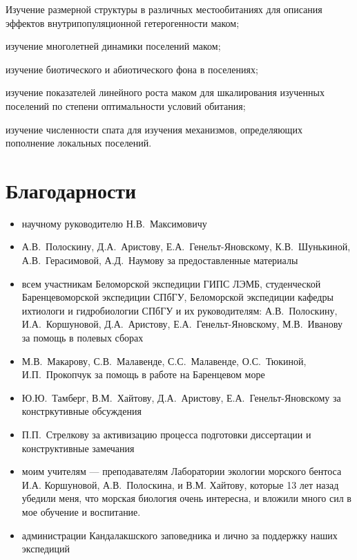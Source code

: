 
    \item Изучение размерной %
структуры в различных местообитаниях для описания эффектов внутрипопуляционной гетерогенности маком;
    \item изучение многолетней динамики поселений маком;
    \item изучение биотического и абиотического фона в поселениях;
    \item изучение показателей линейного роста маком для шкалирования изученных поселений по степени оптимальности условий обитания;
    \item изучение численности спата для изучения механизмов, определяющих пополнение локальных поселений.



\section{Благодарности}
	\begin{itemize}
		\item{научному руководителю Н.\:В.~Максимовичу}
		\item{А.\:В.~Полоскину, Д.\:А.~Аристову, Е.\:А.~Генельт-Яновскому, К.\:В.~Шунькиной, А.\:В.~Герасимовой, А.\:Д.~Наумову за предоставленные материалы}
		\item{всем участникам Беломорской экспедиции ГИПС ЛЭМБ, студенческой Баренцевоморской экспедиции СПбГУ, Беломорской экспедиции кафедры ихтиологи и гидробиологии СПбГУ и их руководителям: А.\:В.~Полоскину, И.\:А.~Коршуновой, Д.\:А.~Аристову, Е.\:А.~Генельт-Яновскому, М.В.~Иванову за помощь в полевых сборах}
		\item{М.\:В.~Макарову, С.\:В.~Малавенде, С.\:С.~Малавенде, О.\:С.~Тюкиной, И.\:П.~Прокопчук за помощь в работе на Баренцевом море}
		\item{Ю.\:Ю.~Тамберг, В.\:М.~Хайтову, Д.\:А.~Аристову, Е.\:А.~Генельт-Яновскому за констркутивные обсуждения}
		\item{П.\:П.~Стрелкову за активизацию процесса подготовки диссертации и конструктивные замечания}
		\item{моим учителям --- преподавателям Лаборатории экологии морского бентоса И.\:А. Коршуновой, А.\:В.~Полоскина,  и В.\:М. Хайтову, которые 13 лет назад убедили меня, что морская биология очень интересна, и вложили много сил в мое обучение и воспитание.}
		\item{администрации Кандалакшского заповедника и лично  за поддержку наших экспедиций}
	\end{itemize}
